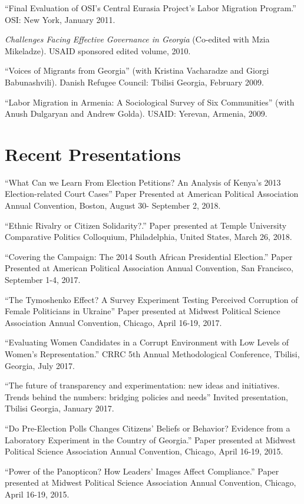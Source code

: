 \documentclass[margin,line]{res}
\begin{document}
{\begin{resume}
``Final Evaluation of OSI's Central Eurasia Project's Labor Migration
Program.'' OSI: New York, January 2011. 

\emph{Challenges Facing Effective Governance in Georgia} (Co-edited with Mzia Mikeladze). USAID sponsored edited volume, 2010.  

``Voices of Migrants
from Georgia''  (with Kristina Vacharadze and Giorgi Babunashvili).
Danish Refugee Council: Tbilisi Georgia, February 2009.

``Labor Migration in Armenia:
A Sociological Survey of Six Communities'' (with Anush Dulgaryan and
Andrew Golda).  USAID: Yerevan, Armenia, 2009.

\section{\sc Recent Presentations}

``What Can we Learn From Election Petitions? An Analysis of Kenya's
2013 Election-related Court Cases''  Paper Presented at
American Political Association Annual Convention, Boston, August 30-
September 2, 2018.

 ``Ethnic Rivalry or Citizen Solidarity?.'' Paper presented at Temple
 University Comparative Politics Colloquium, Philadelphia, United
 States, March 26, 2018.

``Covering the Campaign: The 2014 South African Presidential Election.'' Paper Presented at
American Political Association Annual Convention, San Francisco, September
1-4, 2017.

``The Tymoshenko Effect? A Survey Experiment Testing Perceived Corruption of Female Politicians in Ukraine''
Paper presented at Midwest Political Science Association Annual
Convention, Chicago, April 16-19, 2017.

``Evaluating Women Candidates in a Corrupt Environment with Low Levels of Women’s Representation.''
CRRC 5th Annual Methodological Conference, Tbilisi, Georgia, July 2017.

``The future of transparency and experimentation: new ideas and
initiatives. Trends behind the numbers: bridging policies and needs''
Invited presentation, Tbilisi Georgia, January 2017. 

``Do Pre-Election Polls Changes Citizens' Beliefs or Behavior?
Evidence from a Laboratory Experiment in the Country of Georgia.''
Paper presented at Midwest Political Science Association Annual
Convention, Chicago, April 16-19, 2015.

``Power of the Panopticon? How Leaders' Images Affect Compliance.''
Paper presented at Midwest Political Science Association Annual
Convention, Chicago, April 16-19, 2015.


\end{resume}}
\end{document}
